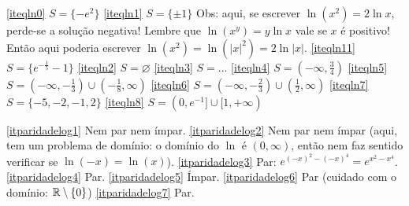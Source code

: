\begin{Solution}{3.14}
\eqref{iteqln0} $S=\{-e^2\}$
\eqref{iteqln1} $S=\{\pm 1\}$ Obs: aqui, se escrever $\ln(x^2)=2\ln x$, perde-se
a solução negativa! Lembre que $\ln (x^y)=y\ln x$ vale se $x$ é positivo! Então
aqui poderia escrever $\ln(x^2)=\ln (|x|^2)=2\ln |x|$.
\eqref{iteqln11} $S=\{e^{-\tfrac15}-1\}$
\eqref{iteqln2} $S=\varnothing$
\eqref{iteqln3} $S=...$
\eqref{iteqln4} $S=(-\infty,\tfrac34)$
\eqref{iteqln5} $S=(-\infty,-\tfrac13)\cup (-\tfrac18,\infty)$
\eqref{iteqln6} $S=(-\infty,-\tfrac23)\cup (\tfrac12,\infty)$
\eqref{iteqln7} $S=\{-5,-2,-1,2\}$
\eqref{iteqln8} $S=(0,e^{-1}]\cup [1,+\infty)$
\end{Solution}
\begin{Solution}{3.15}
\eqref{itparidadelog1} Nem par nem ímpar.
\eqref{itparidadelog2} Nem par nem ímpar (aqui, tem um problema de domínio: o
domínio do $\ln$ é $(0,\infty)$, então nem faz sentido verificar se
$\ln (-x)=\ln (x)$).
\eqref{itparidadelog3} Par: $e^{(-x)^2-(-x)^4}=e^{x^2-x^4}$.
\eqref{itparidadelog4} Par.
\eqref{itparidadelog5} Ímpar.
\eqref{itparidadelog6} Par (cuidado com o domínio: $\mathbb{R}\setminus\{0\}$)
\eqref{itparidadelog7} Par.
\end{Solution}
